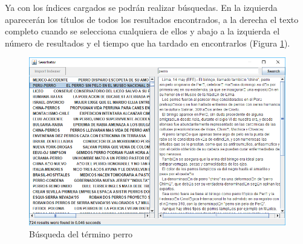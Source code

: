 Ya con los índices cargados se podrán realizar búsquedas. En la izquierda aparecerán los títulos de todos los resultados encontrados, a la derecha el texto completo cuando se selecciona cualquiera de ellos y abajo a la izquierda el número de resultados y el tiempo que ha tardado en encontrarlos (Figura \ref{fig:search}).

\begin{figure}[H]
	\centering
	\includegraphics[width=12cm]{img/search}
	\caption{Búsqueda del término perro}
	\label{fig:search}
\end{figure}




